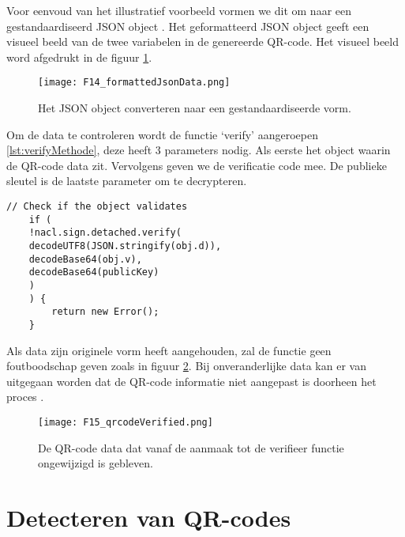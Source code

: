 Voor eenvoud van het illustratief voorbeeld vormen we dit om naar een gestandaardiseerd \ac{JSON} object \autocite{Concept}. Het geformatteerd \ac{JSON} object geeft een visueel beeld van de twee variabelen in de genereerde QR-code. Het visueel beeld word afgedrukt in de figuur \ref{fig:formattedJsonData}.

\begin{figure}[h]
    \centering
    \texttt{[image: F14\_formattedJsonData.png]}
    \captionsetup{justification=ce/brntering, singlelinecheck=false}    
    \caption{Het JSON object converteren naar een gestandaardiseerde vorm.}
    \label{fig:formattedJsonData}
\end{figure}

\newpage
Om de data te controleren wordt de functie ‘verify’ aangeroepen \ref{lst:verifyMethode}, deze heeft 3 parameters nodig. Als eerste het object waarin de QR-code data zit. Vervolgens geven we de verificatie code mee. De publieke sleutel is de laatste parameter om te decrypteren.


\begin{lstlisting}[caption={De controle van QR-code data met de TweetNaCL.js verifieer functie.}, label={lst:verifyMethode}]
    // Check if the object validates
    if (
    !nacl.sign.detached.verify(
    decodeUTF8(JSON.stringify(obj.d)),
    decodeBase64(obj.v),
    decodeBase64(publicKey)
    )
    ) {
        return new Error();
    }
\end{lstlisting}

Als data zijn originele vorm heeft aangehouden, zal de functie geen foutboodschap geven zoals in figuur \ref{fig:qrdataVerified}. Bij onveranderlijke data kan er van uitgegaan worden dat de QR-code informatie niet aangepast is doorheen het proces \autocite{Bernsteinb}. 

\begin{figure}[h]
    \centering
    \texttt{[image: F15\_qrcodeVerified.png]}
    \captionsetup{justification=ce/brntering, singlelinecheck=false}    
    \caption{De QR-code data dat vanaf de aanmaak tot de verifieer  functie ongewijzigd is gebleven.}
    \label{fig:qrdataVerified}
\end{figure}

\newpage

\section{Detecteren van QR-codes}
\label{sec:detecterenQr-codes}

